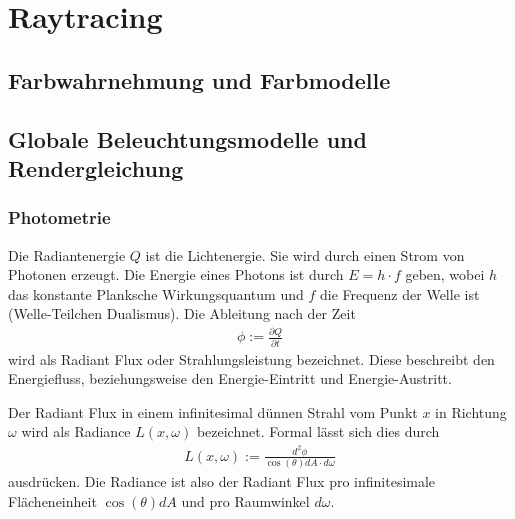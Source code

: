 \section{Raytracing}

\subsection{Farbwahrnehmung und Farbmodelle}
\subsection{Globale Beleuchtungsmodelle und Rendergleichung}
\subsubsection{Photometrie}
Die Radiantenergie $Q$ ist die Lichtenergie. Sie wird durch einen Strom von Photonen erzeugt. Die Energie eines Photons ist 
durch $E=h \cdot f$ geben, wobei $h$ das konstante Planksche Wirkungsquantum und $f$ die Frequenz der Welle ist (Welle-Teilchen Dualismus).  
Die Ableitung nach der Zeit
\begin{align}
\phi := \frac{\partial Q}{\partial t}
\end{align}
wird als Radiant Flux oder Strahlungsleistung bezeichnet. Diese  beschreibt den Energiefluss, beziehungsweise den Energie-Eintritt und Energie-Austritt.

Der Radiant Flux in einem infinitesimal dünnen Strahl vom Punkt $x$ in Richtung $\omega$ wird als Radiance $L(x, \omega)$ bezeichnet.  Formal lässt sich dies durch 
\begin{align}
L(x, \omega) := \frac{d^2 \phi}{\cos(\theta) dA \cdot d\omega}
\end{align}
ausdrücken. Die Radiance ist also der Radiant Flux pro infinitesimale Flächeneinheit $\cos(\theta) dA$ und pro  Raumwinkel $d \omega$.

